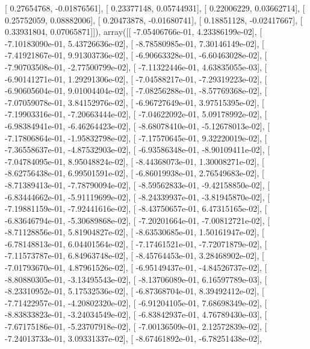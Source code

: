\documentclass{article}
\begin{document}
       [ 0.27654768, -0.01876561],
       [ 0.23377148,  0.05744931],
       [ 0.22006229,  0.03662714],
       [ 0.25752059,  0.08882006],
       [ 0.20473878, -0.01680741],
       [ 0.18851128, -0.02417667],
       [ 0.33931804,  0.07065871]]), array([[ -7.05406766e-01,   4.23386199e-02],
       [ -7.10183090e-01,   5.43726636e-02],
       [ -8.78580985e-01,   7.30146149e-02],
       [ -7.41921867e-01,   9.91303736e-02],
       [ -6.90663328e-01,  -6.60463028e-02],
       [ -7.90703508e-01,  -2.77500799e-02],
       [ -7.11322446e-01,   4.63835055e-03],
       [ -6.90141271e-01,   1.29291306e-02],
       [ -7.04588217e-01,  -7.29319223e-02],
       [ -6.90605604e-01,   9.01004404e-02],
       [ -7.08256288e-01,  -8.57769368e-02],
       [ -7.07059078e-01,   3.84152976e-02],
       [ -6.96727649e-01,   3.97515395e-02],
       [ -7.19903316e-01,  -7.20663444e-02],
       [ -7.04622092e-01,   5.09178992e-02],
       [ -6.98384941e-01,  -6.46264423e-02],
       [ -8.68078410e-01,  -5.12678013e-02],
       [ -7.17806864e-01,  -1.95832798e-02],
       [ -7.17570645e-01,   9.32220019e-02],
       [ -7.36558637e-01,  -4.87532903e-02],
       [ -6.93586348e-01,  -8.90109411e-02],
       [ -7.04784095e-01,   8.95048824e-02],
       [ -8.44368073e-01,   1.30008271e-02],
       [ -8.62756438e-01,   6.99501591e-02],
       [ -6.86019938e-01,   2.76549683e-02],
       [ -8.71389413e-01,  -7.78790094e-02],
       [ -8.59562833e-01,  -9.42158850e-02],
       [ -6.83444662e-01,  -5.91119699e-02],
       [ -8.24339937e-01,  -3.81945870e-02],
       [ -7.19881159e-01,  -7.92441616e-02],
       [ -8.43750657e-01,   6.47315165e-02],
       [ -6.83646794e-01,  -5.30689868e-02],
       [ -7.20201664e-01,  -7.00812721e-02],
       [ -8.71128856e-01,   5.81904827e-02],
       [ -8.63530685e-01,   1.50161947e-02],
       [ -6.78148813e-01,   6.04401564e-02],
       [ -7.17461521e-01,  -7.72071879e-02],
       [ -7.11573787e-01,   6.84963748e-02],
       [ -8.45764453e-01,   3.28468902e-02],
       [ -7.01793670e-01,   4.87961526e-02],
       [ -6.95149437e-01,  -4.84526737e-02],
       [ -8.80880305e-01,  -3.13495543e-02],
       [ -8.13706089e-01,   6.16597789e-03],
       [ -8.23310952e-01,   5.17532536e-02],
       [ -6.87368704e-01,   8.39492412e-02],
       [ -7.71422957e-01,  -4.20802320e-02],
       [ -6.91204105e-01,   7.68698349e-02],
       [ -8.83833823e-01,  -3.24034549e-02],
       [ -6.83842937e-01,   4.76789430e-03],
       [ -7.67175186e-01,  -5.23707918e-02],
       [ -7.00136509e-01,   2.12572839e-02],
       [ -7.24013733e-01,   3.09331337e-02],
       [ -8.67461892e-01,  -6.78251438e-02],
\end{document}
